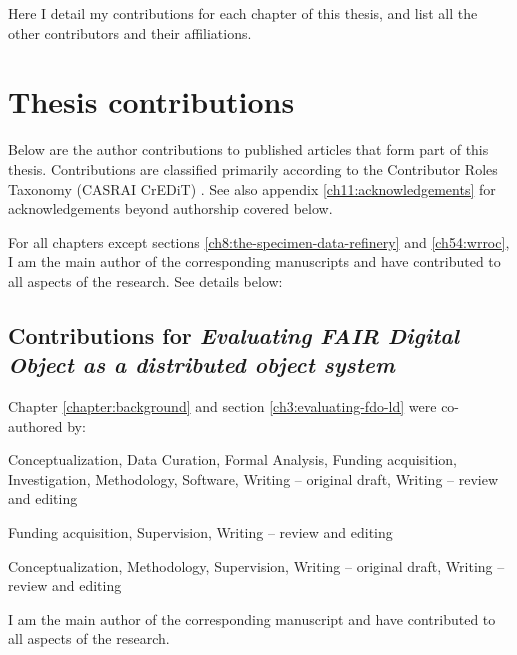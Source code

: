 \label{ch10:contributions} 

Here I detail my contributions for each chapter of this thesis, and
list all the other contributors and their affiliations.



\section{Thesis contributions}\label{ch10:my-contributions}

Below are the author contributions to published articles that form part
of this thesis. Contributions are classified primarily according to the
Contributor Roles Taxonomy (CASRAI CrEDiT) \cite{Brand 2015}. See 
also appendix \vref{ch11:acknowledgements} for acknowledgements beyond authorship covered below.

For all chapters except sections \ref{ch8:the-specimen-data-refinery} and \ref{ch54:wrroc}, I am the main author of the corresponding manuscripts and have contributed to all aspects of the research. See details below:


\subsection{Contributions for \emph{Evaluating FAIR Digital
Object as a distributed object system}}\label{ch10:fdo}

Chapter \vref{chapter:background} and section \vref{ch3:evaluating-fdo-ld} were co-authored by:

\begin{flushleft}\begin{description}
\tightlist
\item[Stian Soiland-Reyes]
Conceptualization, Data Curation, Formal Analysis, Funding acquisition, Investigation,
Methodology, Software, Writing -- original draft, Writing -- review and
editing
\item[Carole Goble]
Funding acquisition, Supervision, Writing -- review and editing
\item[Paul Groth]
Conceptualization, Methodology, Supervision, Writing -- original draft, Writing -- review
and editing
\end{description}\end{flushleft}

I am the main author of the corresponding manuscript and have contributed to all aspects of the research. 


